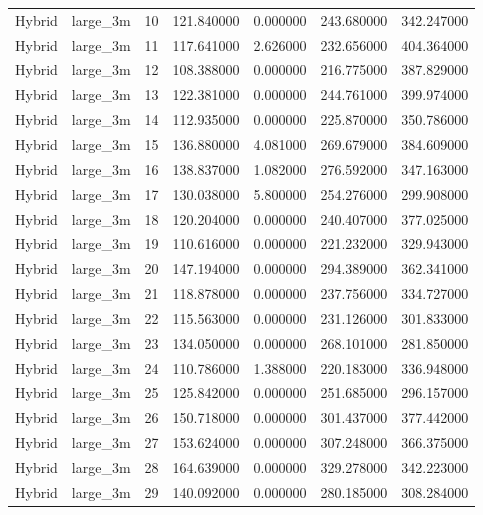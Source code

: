 \begin{tabular}{llrrrrr}
Hybrid & large_3m & 10 & 121.840000 & 0.000000 & 243.680000 & 342.247000 \\
Hybrid & large_3m & 11 & 117.641000 & 2.626000 & 232.656000 & 404.364000 \\
Hybrid & large_3m & 12 & 108.388000 & 0.000000 & 216.775000 & 387.829000 \\
Hybrid & large_3m & 13 & 122.381000 & 0.000000 & 244.761000 & 399.974000 \\
Hybrid & large_3m & 14 & 112.935000 & 0.000000 & 225.870000 & 350.786000 \\
Hybrid & large_3m & 15 & 136.880000 & 4.081000 & 269.679000 & 384.609000 \\
Hybrid & large_3m & 16 & 138.837000 & 1.082000 & 276.592000 & 347.163000 \\
Hybrid & large_3m & 17 & 130.038000 & 5.800000 & 254.276000 & 299.908000 \\
Hybrid & large_3m & 18 & 120.204000 & 0.000000 & 240.407000 & 377.025000 \\
Hybrid & large_3m & 19 & 110.616000 & 0.000000 & 221.232000 & 329.943000 \\
Hybrid & large_3m & 20 & 147.194000 & 0.000000 & 294.389000 & 362.341000 \\
Hybrid & large_3m & 21 & 118.878000 & 0.000000 & 237.756000 & 334.727000 \\
Hybrid & large_3m & 22 & 115.563000 & 0.000000 & 231.126000 & 301.833000 \\
Hybrid & large_3m & 23 & 134.050000 & 0.000000 & 268.101000 & 281.850000 \\
Hybrid & large_3m & 24 & 110.786000 & 1.388000 & 220.183000 & 336.948000 \\
Hybrid & large_3m & 25 & 125.842000 & 0.000000 & 251.685000 & 296.157000 \\
Hybrid & large_3m & 26 & 150.718000 & 0.000000 & 301.437000 & 377.442000 \\
Hybrid & large_3m & 27 & 153.624000 & 0.000000 & 307.248000 & 366.375000 \\
Hybrid & large_3m & 28 & 164.639000 & 0.000000 & 329.278000 & 342.223000 \\
Hybrid & large_3m & 29 & 140.092000 & 0.000000 & 280.185000 & 308.284000 \\
\bottomrule
\end{tabular}

